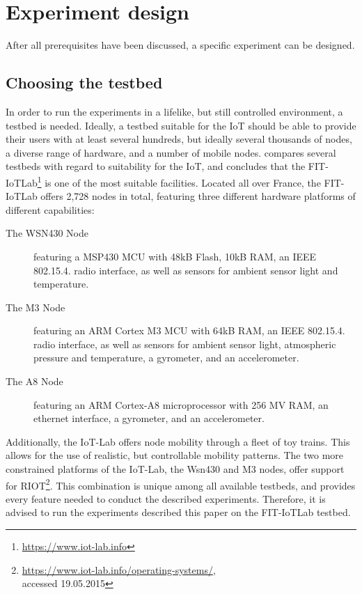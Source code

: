 \documentclass{acm_proc_article-sp}
\begin{document}
\section{Experiment design}
\label{sec:Design}
After all prerequisites have been discussed, a specific experiment can be designed.

\subsection{Choosing the testbed}
\label{subsec:testbed_choice}
In order to run the experiments in a lifelike, but still controlled environment, a testbed is needed. Ideally, a testbed suitable for the IoT should be able to provide their users with at least several hundreds, but ideally several thousands of nodes, a diverse range of hardware, and a number of mobile nodes. \cite{testbed-survey} compares several testbeds with regard to suitability for the IoT, and concludes that the FIT-IoTLab\footnote{ \url{https://www.iot-lab.info}} is one of the most suitable facilities. Located all over France, the FIT-IoTLab offers 2,728 nodes in total, featuring three different hardware platforms of different capabilities:
\begin{description}
\item[The WSN430 Node] featuring a MSP430 MCU with 48kB Flash, 10kB RAM, an IEEE 802.15.4. radio interface, as well as sensors for ambient sensor light and temperature.
\item[The M3 Node] featuring an ARM Cortex M3 MCU with 64kB RAM, an IEEE 802.15.4. radio interface, as well as sensors for ambient sensor light, atmospheric pressure and temperature, a gyrometer, and an accelerometer.
\item[The A8 Node] featuring an ARM Cortex-A8 microprocessor with 256 MV RAM, an ethernet interface, a gyrometer, and an accelerometer.
\end{description}
Additionally, the IoT-Lab offers node mobility through a fleet of toy trains. This allows for the use of realistic, but controllable mobility patterns.
The two more constrained platforms of the IoT-Lab, the Wsn430 and M3 nodes, offer support for RIOT\cite{riot}\footnote{ \url{https://www.iot-lab.info/operating-systems/}, \\accessed 19.05.2015}.
This combination is unique among all available testbeds, and provides every feature needed to conduct the described experiments. Therefore, it is advised to run the experiments described this paper on the FIT-IoTLab testbed.
\end{document}
